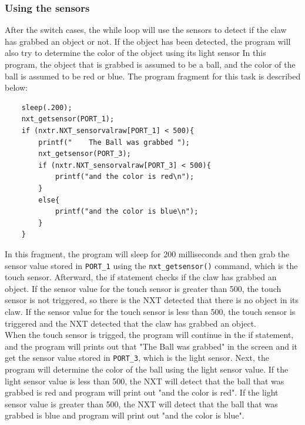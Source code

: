 \documentclass[12pt]{article}
\begin{document}
\subsubsection*{Using the sensors}
After the switch cases, the while loop will use the sensors to detect if the claw has grabbed an object or not.
If the object has been detected, the program will also try to determine the color of the object using its
    light sensor
In this program, the object that is grabbed is assumed to be a ball, and the color of the ball is assumed to
    be red or blue.
The program fragment for this task is described below:
\begin{verbatim}
    sleep(.200);
    nxt_getsensor(PORT_1);
    if (nxtr.NXT_sensorvalraw[PORT_1] < 500){
        printf("    The Ball was grabbed ");
        nxt_getsensor(PORT_3);
        if (nxtr.NXT_sensorvalraw[PORT_3] < 500){
            printf("and the color is red\n");
        }
        else{
            printf("and the color is blue\n");
        }
    }
\end{verbatim}
In this fragment, the program will sleep for 200 milliseconds and then grab the sensor value stored in
    \verb+PORT_1+ using the \verb+nxt_getsensor()+ command, which is the touch sensor.
Afterward, the if statement checks if the claw has grabbed an object.
If the sensor value for the touch sensor is greater than 500, the touch sensor is not triggered, so there is the NXT
    detected that there is no object in its claw.
If the sensor value for the touch sensor is less than 500, the touch sensor is triggered and the NXT detected that
    the claw has grabbed an object.
\\
When the touch sensor is trigged, the program will continue in the if statement, and the program will 
    prints out that "The Ball was grabbed" in the screen and it get the sensor value stored in
    \verb+PORT_3+, which is the light sensor.
Next, the program will determine the color of the ball using the light sensor value.
If the light sensor value is less than 500, the NXT will detect that the ball that was grabbed is red
    and program will print out "and the color is red".
If the light sensor value is greater than 500, the NXT will detect that the ball that was grabbed is blue
    and program will print out "and the color is blue".
\\
\end{document}
